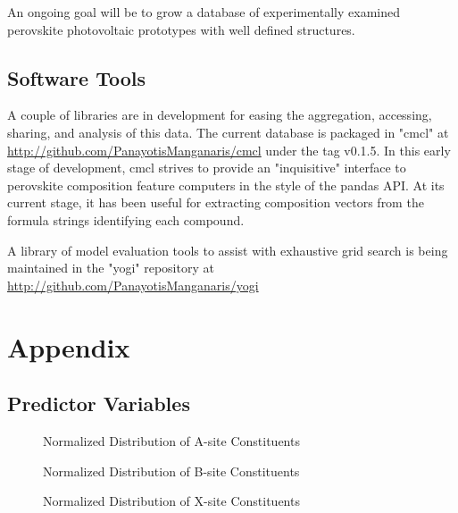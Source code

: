 \documentclass[aip, jmp, amsmath, amssymb, nofootinbib]{revtex4-2}
\begin{document}
An ongoing goal will be to grow a database of experimentally examined
perovskite photovoltaic prototypes with well defined structures.

\subsection*{Software Tools}
\label{sec:org2371930}
A couple of libraries are in development for easing the aggregation,
accessing, sharing, and analysis of this data. The current database is
packaged in "cmcl" at \url{http://github.com/PanayotisManganaris/cmcl} under
the tag v0.1.5. In this early stage of development, cmcl strives to
provide an "inquisitive" interface to perovskite composition feature
computers in the style of the pandas API. At its current stage, it has
been useful for extracting composition vectors from the formula
strings identifying each compound.

A library of model evaluation tools to assist with exhaustive grid
search is being maintained in the "yogi" repository at
\url{http://github.com/PanayotisManganaris/yogi}

\section*{}
\label{sec:org88c04ad}
\pagebreak


\printglossaries

\section*{Appendix}
\label{sec:org2d1aeec}
\subsection*{Predictor Variables}
\label{sec:orge09f193}
 
\begin{figure}[htbp]
\centering

\caption{Normalized Distribution of A-site Constituents}
\end{figure}

 
\begin{figure}[htbp]
\centering

\caption{Normalized Distribution of B-site Constituents}
\end{figure}

 
\begin{figure}[htbp]
\centering

\caption{Normalized Distribution of X-site Constituents}
\end{figure}
\end{document}
